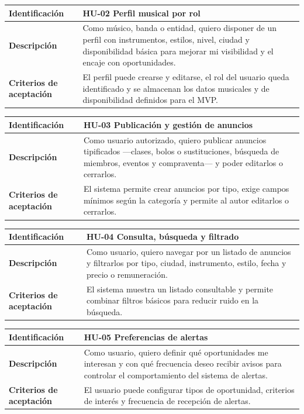 \documentclass[12pt,a4paper]{report}
\begin{document}
\begin{center}
\begin{tabular}{|L{2.9cm}|L{10cm}|}
\hline
\textbf{Identificación} & HU-02 Perfil musical por rol \\
\hline
\textbf{Descripción} & Como músico, banda o entidad, quiero disponer de un perfil con instrumentos, estilos, nivel, ciudad y disponibilidad básica para mejorar mi visibilidad y el encaje con oportunidades. \\
\hline
\textbf{Criterios de aceptación} & El perfil puede crearse y editarse, el rol del usuario queda identificado y se almacenan los datos musicales y de disponibilidad definidos para el MVP. \\
\hline
\end{tabular}
\end{center}

\begin{center}
\begin{tabular}{|L{2.9cm}|L{10cm}|}
\hline
\textbf{Identificación} & HU-03 Publicación y gestión de anuncios \\
\hline
\textbf{Descripción} & Como usuario autorizado, quiero publicar anuncios tipificados ---clases, bolos o sustituciones, búsqueda de miembros, eventos y compraventa--- y poder editarlos o cerrarlos. \\
\hline
\textbf{Criterios de aceptación} & El sistema permite crear anuncios por tipo, exige campos mínimos según la categoría y permite al autor editarlos o cerrarlos. \\
\hline
\end{tabular}
\end{center}

\begin{center}
\begin{tabular}{|L{2.9cm}|L{10cm}|}
\hline
\textbf{Identificación} & HU-04 Consulta, búsqueda y filtrado \\
\hline
\textbf{Descripción} & Como usuario, quiero navegar por un listado de anuncios y filtrarlos por tipo, ciudad, instrumento, estilo, fecha y precio o remuneración. \\
\hline
\textbf{Criterios de aceptación} & El sistema muestra un listado consultable y permite combinar filtros básicos para reducir ruido en la búsqueda. \\
\hline
\end{tabular}
\end{center}

\begin{center}
\begin{tabular}{|L{2.9cm}|L{10cm}|}
\hline
\textbf{Identificación} & HU-05 Preferencias de alertas \\
\hline
\textbf{Descripción} & Como usuario, quiero definir qué oportunidades me interesan y con qué frecuencia deseo recibir avisos para controlar el comportamiento del sistema de alertas. \\
\hline
\textbf{Criterios de aceptación} & El usuario puede configurar tipos de oportunidad, criterios de interés y frecuencia de recepción de alertas. \\
\hline
\end{tabular}
\end{center}
\end{document}
